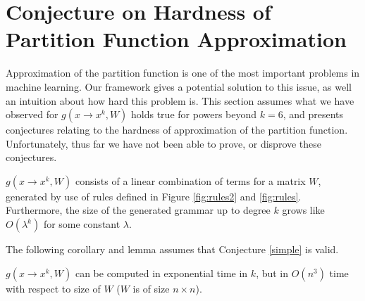 \section{Conjecture on Hardness of Partition Function Approximation}
Approximation of the partition function is one of the most important problems
in machine learning.  Our framework gives a potential solution to this
issue, as well an intuition about how hard this problem is. This
section assumes what we have observed for $g(x \rightarrow x^k, W)$
holds true for powers beyond $k=6$, and presents conjectures relating to the hardness of
approximation of the partition function. Unfortunately, thus far we
have not been able to prove, or disprove these conjectures.
\begin{conjecture}
  $g(x \rightarrow x^k, W)$ consists of a linear combination of terms
  for a matrix $W$, generated by use of rules defined in Figure
  \ref{fig:rules2} and \ref{fig:rules}. Furthermore, the size of the generated grammar up to degree $k$
  grows like $O(\lambda^k)$ for some constant $\lambda$.
\label{simple}
\end{conjecture}

The following corollary and lemma assumes that Conjecture \ref{simple} is valid.

\begin{corollary}
	$g(x \rightarrow x^k, W)$
	can be computed in exponential time in $k$, but in $O(n^3)$ time with respect to size of $W$ ($W$ is of size $n \times n$).
\end{corollary}

